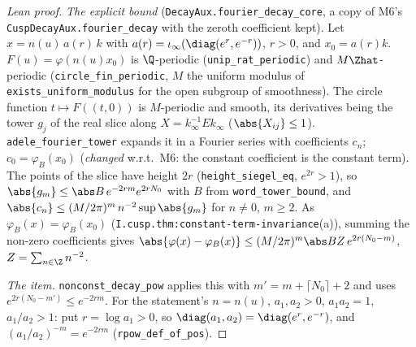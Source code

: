 \begin{proof}[Lean proof]
\emph{The explicit bound} (\texttt{DecayAux.fourier\_decay\_core}, a copy of M6's \texttt{CuspDecayAux.fourier\_decay} with the zeroth coefficient kept). Let $x=n(u)\,a(r)\,k$ with $a(r)=\iota_\infty(\diag(e^r,e^{-r}))$, $r>0$, and $x_0=a(r)k$. $F(u)=\varphi(n(u)x_0)$ is $\Q$-periodic (\texttt{unip\_rat\_periodic}) and $M\Zhat$-periodic (\texttt{circle\_fin\_periodic}, $M$ the uniform modulus of \texttt{exists\_uniform\_modulus} for the open subgroup of smoothness). The circle function $t\mapsto F((t,0))$ is $M$-periodic and smooth, its derivatives being the tower $g_j$ of the real slice along $X=k_\infty^{-1}Ek_\infty$ ($\abs{X_{ij}}\le1$). \texttt{adele\_fourier\_tower} expands it in a Fourier series with coefficients $c_n$; $c_0=\varphi_B(x_0)$ (\emph{changed} w.r.t.\ M6: the constant coefficient is the constant term). The points of the slice have height $2r$ (\texttt{height\_siegel\_eq}, $e^{2r}>1$), so $\abs{g_m}\le\abs B\,e^{-2rm}e^{2rN_0}$ with $B$ from \texttt{word\_tower\_bound}, and $\abs{c_n}\le(M/2\pi)^m\,n^{-2}\sup\abs{g_m}$ for $n\ne0$, $m\ge2$. As $\varphi_B(x)=\varphi_B(x_0)$ (\texttt{I.cusp.thm:constant-term-invariance}(a)), summing the non-zero coefficients gives $\abs{\varphi(x)-\varphi_B(x)}\le(M/2\pi)^m\abs BZ\,e^{2r(N_0-m)}$, $Z=\sum_{n\in\Z}n^{-2}$.

\emph{The item.} \texttt{nonconst\_decay\_pow} applies this with $m'=m+\lceil N_0\rceil+2$ and uses $e^{2r(N_0-m')}\le e^{-2rm}$. For the statement's $n=n(u)$, $a_1,a_2>0$, $a_1a_2=1$, $a_1/a_2>1$: put $r=\log a_1>0$, so $\diag(a_1,a_2)=\diag(e^r,e^{-r})$, and $(a_1/a_2)^{-m}=e^{-2rm}$ (\texttt{rpow\_def\_of\_pos}).
\end{proof}

